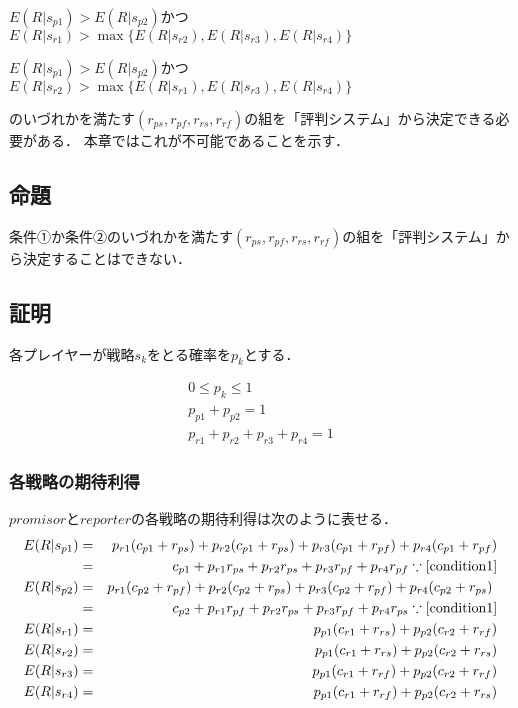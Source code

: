 \begin{description}
  \centering
  \item[条件①] $E(R|s_{p1})>E(R|s_{p2})$かつ$E(R|s_{r1})>\max\{E(R|s_{r2}), E(R|s_{r3}), E(R|s_{r4}) \}$
  \item[条件②] $E(R|s_{p1})>E(R|s_{p2})$かつ$E(R|s_{r2})>\max\{E(R|s_{r1}), E(R|s_{r3}), E(R|s_{r4}) \}$
\end{description}

のいづれかを満たす$(r_{ps}, r_{pf}, r_{rs}, r_{rf})$の組を「評判システム」から決定できる必要がある．
本章ではこれが不可能であることを示す．

\subsection{命題}
条件①か条件②のいづれかを満たす$(r_{ps}, r_{pf}, r_{rs}, r_{rf})$の組を「評判システム」から決定することはできない．
  
\subsection{証明}
各プレイヤーが戦略$s_{k}$をとる確率を$p_{k}$とする．

\begin{gather}
  0 \leq p_{k} \leq 1 \nonumber \\
  p_{p1} + p_{p2} = 1 \nonumber \\
  p_{r1} + p_{r2} + p_{r3} + p_{r4} = 1 \label{condition1}
\end{gather}

\subsubsection{各戦略の期待利得}
$promisor$と$reporter$の各戦略の期待利得は次のように表せる．
\begin{eqnarray}
  E(R|s_{p1}) &=& p_{r1} (c_{p1} + r_{ps}) + p_{r2} (c_{p1} + r_{ps}) + p_{r3} (c_{p1} + r_{pf}) + p_{r4} (c_{p1} + r_{pf}) \nonumber \\
              &=& c_{p1} + p_{r1} r_{ps} + p_{r2} r_{ps} + p_{r3} r_{pf} + p_{r4} r_{pf} \because\eqref{condition1} \label{expectedA} \\
  E(R|s_{p2}) &=& p_{r1} (c_{p2} + r_{pf}) + p_{r2} (c_{p2} + r_{ps}) + p_{r3} (c_{p2} + r_{pf} ) + p_{r4} (c_{p2} + r_{ps}) \nonumber \\
              &=& c_{p2} + p_{r1} r_{pf} + p_{r2} r_{ps} + p_{r3} r_{pf} + p_{r4} r_{ps} \because\eqref{condition1} \label{expectedB} \\
  E(R|s_{r1}) &=& p_{p1} (c_{r1} + r_{rs}) + p_{p2} (c_{r2} + r_{rf}) \label{expectedR1} \\
  E(R|s_{r2}) &=& p_{p1} (c_{r1} + r_{rs}) + p_{p2} (c_{r2} + r_{rs}) \label{expectedR2} \\
  E(R|s_{r3}) &=& p_{p1} (c_{r1} + r_{rf}) + p_{p2} (c_{r2} + r_{rf}) \label{expectedR3} \\
  E(R|s_{r4}) &=& p_{p1} (c_{r1} + r_{rf}) + p_{p2} (c_{r2} + r_{rs}) \label{expectedR4} \nonumber
\end{eqnarray}

